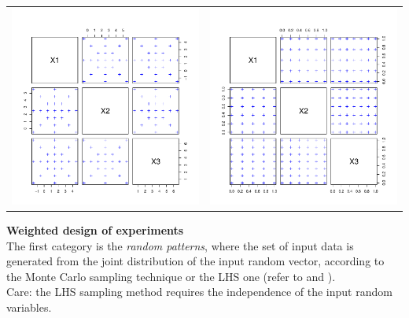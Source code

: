 {\begin{center}
\begin{tabular}{cc}
          \includegraphics[width=8cm]{Figures/Composite_DOE.pdf} & \includegraphics[width=8cm]{Figures/Box_DOE.pdf}
        \end{tabular}
      \end{center}

      \vspace*{2mm}

      {\bf Weighted design of experiments }\\

      The first category is the {\itshape random patterns}, where the set of input data is generated from the joint distribution of the input random vector, according to the Monte Carlo sampling technique or the LHS one (refer to  and ).\\
      Care: the LHS sampling method requires the independence of the input random variables.\\

}
